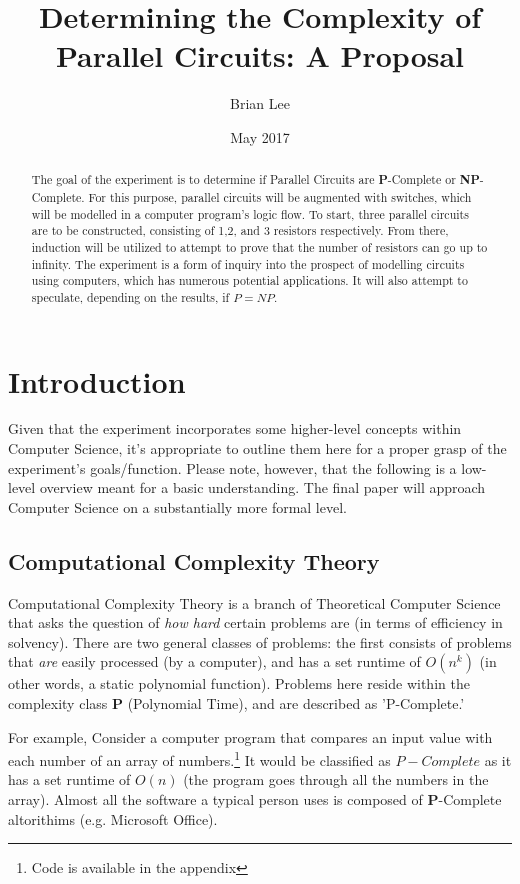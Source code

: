 \documentclass{article}
\title{Determining the Complexity of Parallel Circuits: A Proposal}
\date{May 2017}
\author{Brian Lee}
\begin{document}
\maketitle

\begin{abstract}
The goal of the experiment is to determine if Parallel Circuits are \textbf{P}-Complete or \textbf{NP}-Complete. For this purpose, parallel circuits will be augmented with switches, which will be modelled in a computer program's logic flow. To start, three parallel circuits are to be constructed, consisting of 1,2, and 3 resistors respectively. From there, induction will be utilized to attempt to prove that the number of resistors can go up to infinity. The experiment is a form of inquiry into the prospect of modelling circuits using computers, which has numerous potential applications. It will also attempt to speculate, depending on the results, if $P=NP$.
\end{abstract}

\section{Introduction}
Given that the experiment incorporates some higher-level concepts within Computer Science, it's appropriate to outline them here for a proper grasp of the experiment's goals/function. Please note, however, that the following is a low-level overview meant for a basic understanding. The final paper will approach Computer Science on a substantially more formal level. 
\subsection{Computational Complexity Theory}
Computational Complexity Theory is a branch of Theoretical Computer Science that asks the question of \textit{how hard} certain problems are (in terms of efficiency in solvency). There are two general classes of problems: the first consists of problems that \textit{are} easily processed (by a computer), and has a set runtime of $O(n^{k})$ (in other words, a static polynomial function). Problems here reside within the complexity class \textbf{P} (Polynomial Time), and are described as 'P-Complete.'\cite{michiel}

For example, Consider a computer program that compares an input value with each number of an array of numbers.\footnote{Code is available in the appendix} It would be classified as $P-Complete$ as it has a set runtime of $O(n)$ (the program goes through all the numbers in the array). Almost all the software a typical person uses is composed of \textbf{P}-Complete altorithims (e.g. Microsoft Office).
\end{document}
